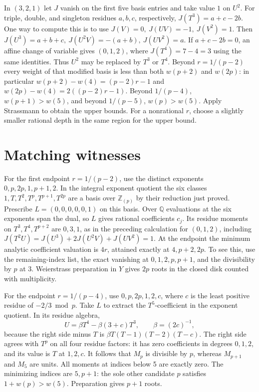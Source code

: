 \documentclass[11pt]{article}
\begin{document}
In \((3,2,1)\) let \(J\) vanish on the first five basis entries
and take value \(1\) on \(U^2\). For triple, double, and singleton
residues \(a,b,c\), respectively, \(J(T^3)=a+c-2b\).
One way to compute this is to use
\(J(V)=0,\ J(UV)=-1,\ J(V^2)=1\). Then
\(J(U^3)=a+b+c,\ J(U^2V)=-(a+b),\ J(UV^2)=a\).
If \(a+c-2b=0\), an affine change of variable gives \((0,1,2)\),
where \(J(T^4)=7-4=3\) using the same identities.
Thus \(U^2\) may be replaced by \(T^3\) or \(T^4\).
Beyond \(r=1/(p-2)\) every weight of that modified basis is
less than both \(w(p+2)\) and \(w(2p)\): in particular
\(w(p+2)-w(4)=(p-2)r-1\) and
\(w(2p)-w(4)=2((p-2)r-1)\).
Beyond \(1/(p-4)\), \(w(p+1)>w(5)\), and beyond \(1/(p-5)\),
\(w(p)>w(5)\). Apply Strassmann to obtain the upper bounds.
For a nonrational \(r\), choose a slightly smaller rational depth
in the same region for the upper bound.
\newpage
\section{Matching witnesses}
For the first endpoint \(r=1/(p-2)\), use the distinct exponents
\(0,p,2p,1,p+1,2\). In the integral exponent quotient the six classes
\(1,T,T^2,T^p,T^{p+1},T^{2p}\) are a basis over \(\mathbb Z_{(p)}\)
by their reduction just proved. Prescribe \(L=(0,0,0,0,0,1)\) on
this basis. Over \(\mathbb Q\) evaluations at the six exponents
span the dual, so \(L\) gives rational coefficients \(c_j\).
Its residue moments on \(T^3,T^4,T^{p+2}\) are \(0,3,1\),
as in the preceding calculation for \((0,1,2)\), including
\(J(T^2U)=J(U^3)+2J(U^2V)+J(UV^2)=1\).
At the endpoint the minimum analytic coefficient valuation is
\(4r\), attained exactly at \(4,p+2,2p\). To see this, use the
remaining-index list, the exact vanishing at \(0,1,2,p,p+1\),
and the divisibility by \(p\) at 3.
Weierstrass preparation in \(Y\) gives \(2p\) roots in the closed
disk counted with multiplicity.

For the endpoint \(r=1/(p-4)\), use \(0,p,2p,1,2,c\), where
\(c\) is the least positive residue of \(-2/3\bmod p\).
Take \(L\) to extract the \(T^5\)-coefficient in the exponent
quotient. In its residue algebra,
\[
 U = \beta T^4-\beta(3+c)T^3,\qquad \beta=(2c)^{-1},
\]
because the right side minus \(T\) is
\(\beta T(T-1)(T-2)(T-c)\). The right side agrees with \(T^p\)
on all four residue factors: it has zero coefficients in degrees \(0,1,2\),
and its value is \(T\) at \(1,2,c\).
It follows that \(M_p\) is divisible by \(p\), whereas
\(M_{p+1}\) and \(M_5\) are units. All moments at indices below
5 are exactly zero. The minimizing indices are \(5,p+1\):
the sole other candidate \(p\) satisfies \(1+w(p)>w(5)\).
Preparation gives \(p+1\) roots.
\end{document}
